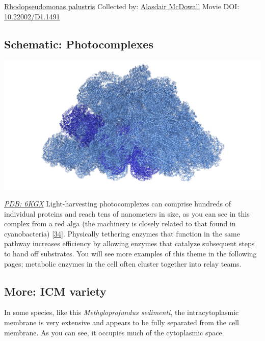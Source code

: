 \documentclass[]{tufte-book}
\begin{document}
\hypertarget{htmlwidget-3bbef7d96977588a38b6}{}

\label{fig:4-3}\protect\hyperlink{tree}{Rhodopseudomonas palustris} Collected by: \protect\hyperlink{alasdair_mcdowall}{Alasdair McDowall} Movie DOI: \href{https://doi.org/10.22002/D1.1491}{10.22002/D1.1491}

\hypertarget{Photocomplexes}{%
\subsection*{Schematic: Photocomplexes}\label{Photocomplexes}}

\includegraphics{img/schematics/4_3_1}

\href{http://rcsb.org/structure/6KGX}{\emph{PDB: 6KGX}}
Light-harvesting photocomplexes can comprise hundreds of individual proteins and reach tens of nanometers in size, as you can see in this complex from a red alga (the machinery is closely related to that found in cyanobacteria) {[}\protect\hyperlink{ref-ma2020}{34}{]}. Physically tethering enzymes that function in the same pathway increases efficiency by allowing enzymes that catalyze subsequent steps to hand off substrates. You will see more examples of this theme in the following pages; metabolic enzymes in the cell often cluster together into relay teams.

\hypertarget{ICM_variety}{%
\subsection*{More: ICM variety}\label{ICM_variety}}

In some species, like this \emph{Methyloprofundus sedimenti}, the intracytoplasmic membrane is very extensive and appears to be fully separated from the cell membrane. As you can see, it occupies much of the cytoplasmic space.
\end{document}
